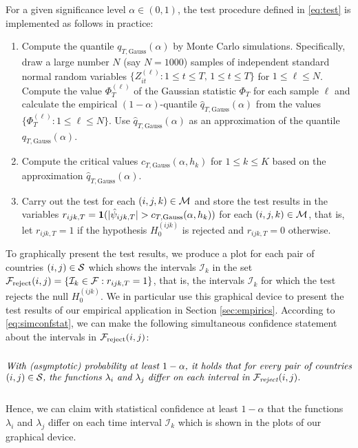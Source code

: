 \documentclass[a4paper,12pt]{article}
\numberwithin{equation}{section}
\begin{document}
For a given significance level $\alpha \in (0,1)$, the test procedure defined in \eqref{eq:test} is implemented as follows in practice: 
\begin{enumerate}[label=\textit{Step \arabic*.}, leftmargin=1.45cm]
\item Compute the quantile $q_{T,\text{Gauss}}(\alpha)$ by Monte Carlo simulations. Specifically, draw a large number $N$ (say $N=1000$) samples of independent standard normal random variables $\{Z_{it}^{(\ell)} : 1 \le t \le T, \, 1 \le t \le T \}$ for $1 \le \ell \le N$. Compute the value $\Phi_T^{(\ell)}$ of the Gaussian statistic $\Phi_T$ for each sample $\ell$ and calculate the empirical $(1-\alpha)$-quantile $\hat{q}_{T,\text{Gauss}}(\alpha)$ from the values $\{ \Phi_T^{(\ell)}: 1 \le \ell \le N \}$. Use $\hat{q}_{T,\text{Gauss}}(\alpha)$ as an approximation of the quantile $q_{T,\text{Gauss}}(\alpha)$. 
\item Compute the critical values $c_{T,\text{Gauss}}(\alpha,h_k)$ for $1 \le k \le K$ based on the approximation $\hat{q}_{T,\text{Gauss}}(\alpha)$.
\item Carry out the test for each $(i,j,k) \in \mathcal{M}$ and store the test results in the variables $r_{ijk,T} = \boldsymbol{1}( |\hat{\psi}_{ijk,T}| > c_{T,\text{Gauss}}(\alpha,h_k))$ for each $(i,j,k) \in \mathcal{M}$, that is, let $r_{ijk,T} = 1$ if the hypothesis $H_0^{(ijk)}$ is rejected and $r_{ijk,T} = 0$ otherwise. 
\end{enumerate}
To graphically present the test results, we produce a plot for each pair of countries $(i,j) \in \mathcal{S}$ which shows the intervals $\mathcal{I}_k$ in the set $\mathcal{F}_{\text{reject}}(i,j) = \{ \mathcal{I}_k \in \mathcal{F}: r_{ijk,T} = 1 \}$, that is, the intervals $\mathcal{I}_k$ for which the test rejects the null $H_0^{(ijk)}$. We in particular use this graphical device to present the test results of our empirical application in Section \ref{sec:empirics}. According to \eqref{eq:simconfstat}, we can make the following simultaneous confidence statement about the intervals in $\mathcal{F}_{\text{reject}}(i,j)$: 
\begin{equation}\label{eq:confidencestatement3}
\begin{minipage}[c][1.75cm][c]{13cm}
\textit{With (asymptotic) probability at least $1-\alpha$, it holds that for every pair of countries $(i,j) \in \pairs$, the functions $\lambda_i$ and $\lambda_j$ differ on each interval in $\intervals_{\text{reject}}(i,j)$.} 
\end{minipage}
\end{equation}
Hence, we can claim with statistical confidence at least $1-\alpha$ that the functions $\lambda_i$ and $\lambda_j$ differ on each time interval $\mathcal{I}_k$ which is shown in the plots of our graphical device. 
\end{document}
